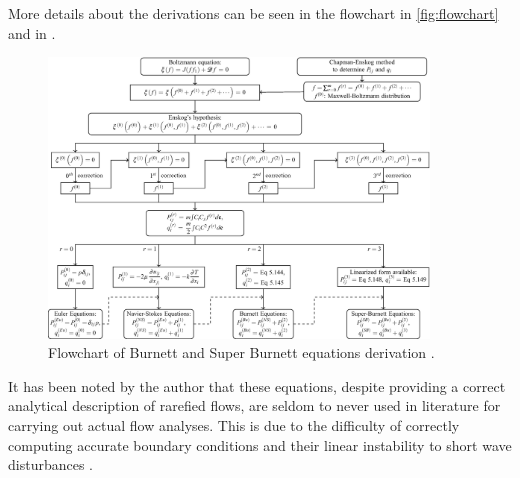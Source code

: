 More details about the derivations can be seen in the flowchart in \autoref{fig:flowchart} and in \cite{burnett}.

\begin{figure}[ht]
    \centering
    \includegraphics[width=0.9\textwidth]{../Images/2. Background/burnettflowchart.png}
    \caption{Flowchart of Burnett and Super Burnett equations derivation \cite{burnett}.}
    \label{fig:flowchart}
\end{figure}

It has been noted by the author that these equations, despite providing a correct analytical description of rarefied flows, are seldom to never used in literature for carrying out actual flow analyses. This is due to the difficulty of correctly computing accurate boundary conditions and their linear instability to short wave disturbances \cite{comprarefied}.

